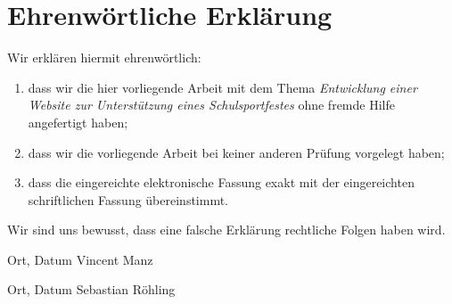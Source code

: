 \clearpage
\chapter*{Ehrenwörtliche Erklärung}	



Wir erklären hiermit ehrenwörtlich: 

\begin{enumerate}
	\item dass wir die hier vorliegende Arbeit mit dem Thema \textit{Entwicklung einer Website zur Unterstützung eines Schulsportfestes} ohne fremde Hilfe angefertigt haben; 
	\item dass wir die vorliegende Arbeit bei keiner anderen Prüfung vorgelegt haben; 
	\item dass die eingereichte elektronische Fassung exakt mit der eingereichten schriftlichen Fassung übereinstimmt.
\end{enumerate}
Wir sind uns bewusst, dass eine falsche Erklärung rechtliche Folgen haben wird.

\vspace{3cm}
Ort, Datum \hfill Vincent Manz

\vspace{3cm}
Ort, Datum \hfill Sebastian Röhling 
